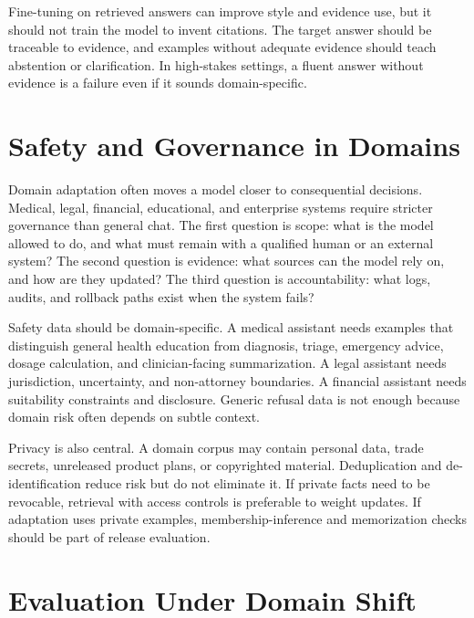 Fine-tuning on retrieved answers can improve style and evidence use, but it should not train the model to invent citations. The target answer should be traceable to evidence, and examples without adequate evidence should teach abstention or clarification. In high-stakes settings, a fluent answer without evidence is a failure even if it sounds domain-specific.

\section{Safety and Governance in Domains}
\label{sec:domain-safety-governance}

Domain adaptation often moves a model closer to consequential decisions. Medical, legal, financial, educational, and enterprise systems require stricter governance than general chat. The first question is scope: what is the model allowed to do, and what must remain with a qualified human or an external system? The second question is evidence: what sources can the model rely on, and how are they updated? The third question is accountability: what logs, audits, and rollback paths exist when the system fails?

Safety data should be domain-specific. A medical assistant needs examples that distinguish general health education from diagnosis, triage, emergency advice, dosage calculation, and clinician-facing summarization. A legal assistant needs jurisdiction, uncertainty, and non-attorney boundaries. A financial assistant needs suitability constraints and disclosure. Generic refusal data is not enough because domain risk often depends on subtle context.

Privacy is also central. A domain corpus may contain personal data, trade secrets, unreleased product plans, or copyrighted material. Deduplication and de-identification reduce risk but do not eliminate it. If private facts need to be revocable, retrieval with access controls is preferable to weight updates. If adaptation uses private examples, membership-inference and memorization checks should be part of release evaluation.

\section{Evaluation Under Domain Shift}
\label{sec:domain-shift-evaluation}

